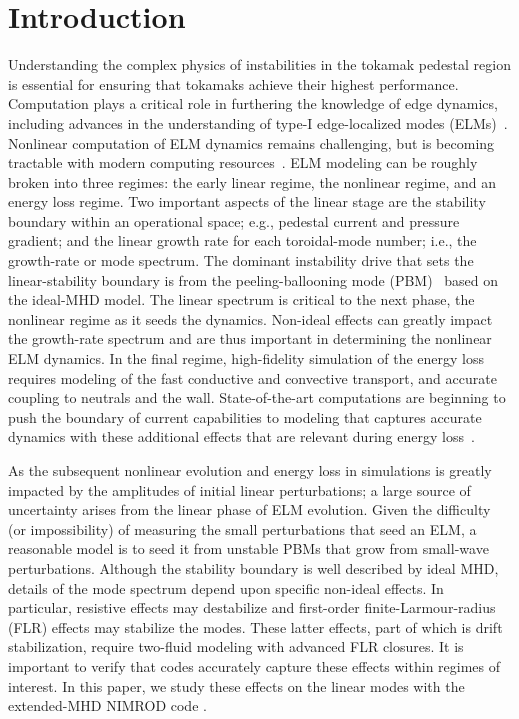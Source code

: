 \section{Introduction}
\label{sec:introduction}

Understanding the complex physics of instabilities in the tokamak pedestal
region is essential for ensuring that tokamaks achieve their highest performance.
Computation plays a critical role in furthering the knowledge of edge dynamics,
including advances in the understanding of type-I edge-localized modes
(ELMs)~\cite{leonard06}.  Nonlinear computation of ELM dynamics remains
challenging, but is becoming tractable with modern computing
resources~\cite{pankin07,sugiyama10,xu10,xu13,xi13,huijsmans13,pamela13}.  ELM
modeling can be roughly broken into three regimes: the early linear regime, the
nonlinear regime, and an energy loss regime.  Two important aspects of the
linear stage are the stability boundary within an operational space;
e.g., pedestal current and pressure gradient; and the linear growth rate for each
toroidal-mode number; i.e.,  the growth-rate or mode spectrum.
The dominant instability drive that sets the linear-stability boundary is from the
peeling-ballooning mode (PBM)~\cite{connor98,Snyder02,snyder04} based on
the ideal-MHD model.
The linear spectrum is critical to the next phase, the nonlinear regime as it
seeds the dynamics.  Non-ideal effects can greatly impact the growth-rate
spectrum and are thus important in determining the nonlinear ELM dynamics.  In
the final regime, high-fidelity simulation of the energy loss requires modeling
of the fast conductive and convective transport, and accurate coupling to
neutrals and the wall.  State-of-the-art computations are beginning to push the
boundary of current capabilities to modeling that captures accurate dynamics
with these additional effects that are relevant during energy
loss~\cite{huijsmans13,pamela13,gui14}.  

As the subsequent nonlinear evolution and energy loss in simulations is greatly
impacted by the amplitudes of initial linear perturbations; a large source of
uncertainty arises from the linear phase of ELM evolution.  Given the
difficulty (or impossibility) of measuring the small perturbations that seed an
ELM, a reasonable model is to seed it from unstable PBMs that grow from
small-wave perturbations.  Although the stability boundary is well described by
ideal MHD, details of the mode spectrum depend upon specific non-ideal effects.
In particular, resistive effects may destabilize and first-order
finite-Larmour-radius (FLR) effects may stabilize the modes. These latter effects,
part of which is drift stabilization, require two-fluid modeling with advanced
FLR closures. It is important to verify that codes accurately capture these
effects within regimes of interest. In this paper, we study these effects on
the linear modes with the extended-MHD NIMROD code \cite{Sovinec04,Sovinec10}.

